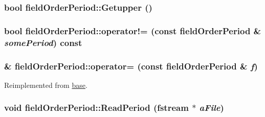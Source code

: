 \label{classfield_order_period_a588c0865c3672ebf99ab2b524c025d0e}
\hypertarget{classfield_order_period_aa35a37c68eab8f59a8ce71aa7f58f0b8}{
\subsubsection[{Getupper}]{\setlength{\rightskip}{0pt plus 5cm}bool fieldOrderPeriod::Getupper ()}}
\label{classfield_order_period_aa35a37c68eab8f59a8ce71aa7f58f0b8}
\hypertarget{classfield_order_period_ad002bb65c92106b8703d4a61501ab071}{
\subsubsection[{operator!=}]{\setlength{\rightskip}{0pt plus 5cm}bool fieldOrderPeriod::operator!= (const {\bf fieldOrderPeriod} \& {\em somePeriod}) const}}
\label{classfield_order_period_ad002bb65c92106b8703d4a61501ab071}
\hypertarget{classfield_order_period_a125328fd2b2dc16b8183dd32a22cb63e}{
\subsubsection[{operator=}]{\& fieldOrderPeriod::operator= (const {\bf fieldOrderPeriod} \& {\em f})}}
\label{classfield_order_period_a125328fd2b2dc16b8183dd32a22cb63e}


Reimplemented from \hyperlink{classbase_abd18e2130f975aacfde1833ad137e3c5}{base}.\hypertarget{classfield_order_period_a7fec8413b4a89e241b3fb02260e489b6}{
\subsubsection[{ReadPeriod}]{\setlength{\rightskip}{0pt plus 5cm}void fieldOrderPeriod::ReadPeriod (fstream $\ast$ {\em aFile})}}
\label{classfield_order_period_a7fec8413b4a89e241b3fb02260e489b6}


